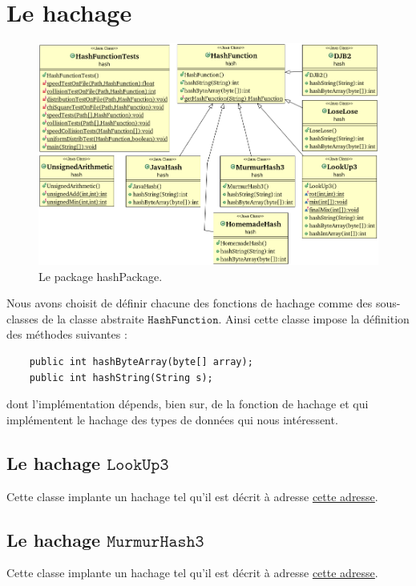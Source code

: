 \documentclass[12pt,a4paper,titlepage]{article}
\newcommand{\class}[1]{$\mathtt{#1}$}
\begin{document}
\newpage
\section{Le hachage}

\begin{figure}
	\label{fig:hashPackage}
	\centering
	\includegraphics[scale=0.75, angle=90]{../Java Workspace/Test Hash/hashPackage.png}
	\caption{Le package hashPackage.}
\end{figure}

Nous avons choisit de définir chacune des fonctions de hachage comme des sous-classes de la classe abstraite \class{HashFunction}.
Ainsi cette classe impose la définition des méthodes suivantes :
\begin{lstlisting}
	public int hashByteArray(byte[] array);
	public int hashString(String s);
\end{lstlisting}
dont l'implémentation dépends, bien sur, de la fonction de hachage et qui implémentent le hachage des types de données qui nous intéressent.

\subsection{Le hachage \class{LookUp3}}
Cette classe implante un hachage tel qu'il est décrit à adresse \href{http://www.burtleburtle.net/bob/c/lookup3.c}{cette adresse}.

\subsection{Le hachage \class{MurmurHash3}}
Cette classe implante un hachage tel qu'il est décrit à adresse \href{http://en.wikipedia.org/wiki/MurmurHash}{cette adresse}.
\end{document}

